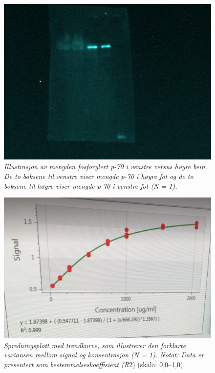 \documentclass[
  letterpaper,
  DIV=11,
  numbers=noendperiod]{scrreprt}
\begin{document}
\newpage

\begin{figure}

{\centering \includegraphics{figur1_analysert_bilde_p70.PNG}

}

\caption{\label{fig-figur1}\emph{Illustrasjon av mengden fosforylert
p-70 i venstre versus høyre bein. De to boksene til venstre viser mengde
p-70 i høyre fot og de to boksene til høyre viser mengde p-70 i venstre
fot (N = 1).}}

\end{figure}

\newpage

\begin{figure}

{\centering \includegraphics{figur2_spredningsplot_trendkurve.PNG}

}

\caption{\label{fig-figur2}\emph{Spredningsplott med trendkurve, som
illustrerer den forklarte variansen mellom signal og konsentrasjon (N =
1). Notat: Data er presentert som bestemmelseskoeffisient (R}2) (skala:
0,0--1,0).}

\end{figure}
\end{document}
